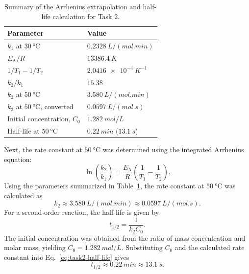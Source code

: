 \begin{table}[htbp]
  \centering
  \caption{Summary of the Arrhenius extrapolation and half-life calculation
  for Task 2.}
  \label{tab:task2-extrapolation}
  \begin{tabular}{ll}
    \toprule
    Parameter & Value \\
    \midrule
    \(k_1\) at \(\SI{30}{\degreeCelsius}\) &
      \(\SI{0.2328}{L/(mol.min)}\) \\
    \(E_{\mathrm{A}}/R\) & \(\SI{13386.4}{K}\) \\
    \(1/T_1-1/T_2\) & \(\SI{2.0416e-4}{K^{-1}}\) \\
    \(k_2/k_1\) & \(15.38\) \\
    \(k_2\) at \(\SI{50}{\degreeCelsius}\) &
      \(\SI{3.580}{L/(mol.min)}\) \\
    \(k_2\) at \(\SI{50}{\degreeCelsius}\), converted &
      \(\SI{0.0597}{L/(mol.s)}\) \\
    Initial concentration, \(C_0\) & \(\SI{1.282}{mol/L}\) \\
    Half-life at \(\SI{50}{\degreeCelsius}\) &
      \(\SI{0.22}{min}\) (\(\SI{13.1}{s}\)) \\
    \bottomrule
  \end{tabular}
\end{table}

Next, the rate constant at \(\SI{50}{\degreeCelsius}\) was determined using the 
integrated Arrhenius equation: \begin{equation} \ln\!\left(\frac{k_2}{k_1}\right) = \frac{E_{\mathrm{A}}}{R} \left(\frac{1}{T_1}-\frac{1}{T_2}\right). \label{eq:task2-integrated-arrhenius} \end{equation} 
Using the parameters summarized in Table~\ref{tab:task2-extrapolation}, the rate constant 
at \(\SI{50}{\degreeCelsius}\) was calculated as \begin{equation} k_2 \approx \SI{3.580}{L/(mol.min)} \approx \SI{0.0597}{L/(mol.s)}. \label{eq:task2-k-at-50} \end{equation} 
For a second-order reaction, the half-life is given by \begin{equation} t_{1/2} = \frac{1}{k_2 C_0}. \label{eq:task2-half-life} \end{equation} 
The initial concentration was obtained from the ratio of mass concentration and molar mass, yielding \(C_0 = \SI{1.282}{mol/L}\). 
Substituting \(C_0\) and the calculated rate constant into Eq.~\eqref{eq:task2-half-life} gives \begin{equation} t_{1/2} \approx \SI{0.22}{min} \approx \SI{13.1}{s}. \label{eq:task2-half-life-result} \end{equation}

